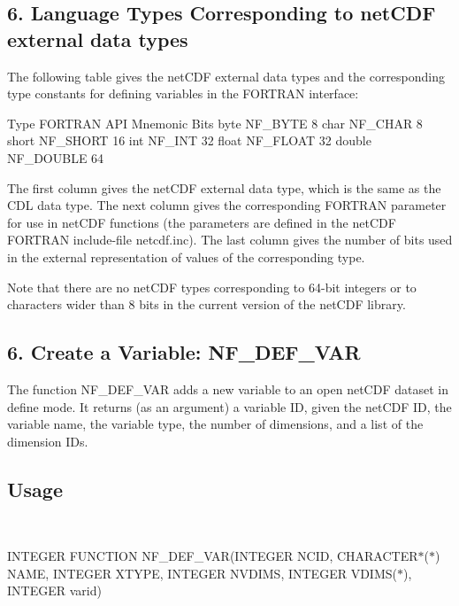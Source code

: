 \subsection*{6. Language Types Corresponding to net\+C\+DF external data types }

The following table gives the net\+C\+DF external data types and the corresponding type constants for defining variables in the F\+O\+R\+T\+R\+AN interface\+:



 Type F\+O\+R\+T\+R\+AN A\+PI Mnemonic Bits byte N\+F\+\_\+\+B\+Y\+TE 8 char N\+F\+\_\+\+C\+H\+AR 8 short N\+F\+\_\+\+S\+H\+O\+RT 16 int N\+F\+\_\+\+I\+NT 32 float N\+F\+\_\+\+F\+L\+O\+AT 32 double N\+F\+\_\+\+D\+O\+U\+B\+LE 64 



The first column gives the net\+C\+DF external data type, which is the same as the C\+DL data type. The next column gives the corresponding F\+O\+R\+T\+R\+AN parameter for use in net\+C\+DF functions (the parameters are defined in the net\+C\+DF F\+O\+R\+T\+R\+AN include-\/file netcdf.\+inc). The last column gives the number of bits used in the external representation of values of the corresponding type.

Note that there are no net\+C\+DF types corresponding to 64-\/bit integers or to characters wider than 8 bits in the current version of the net\+C\+DF library.

\subsection*{6. Create a Variable\+: {\ttfamily N\+F\+\_\+\+D\+E\+F\+\_\+\+V\+AR} }

The function N\+F\+\_\+\+D\+E\+F\+\_\+\+V\+AR adds a new variable to an open net\+C\+DF dataset in define mode. It returns (as an argument) a variable ID, given the net\+C\+DF ID, the variable name, the variable type, the number of dimensions, and a list of the dimension I\+Ds.

\subsection*{Usage }

 

I\+N\+T\+E\+G\+ER F\+U\+N\+C\+T\+I\+ON N\+F\+\_\+\+D\+E\+F\+\_\+\+V\+AR(I\+N\+T\+E\+G\+ER N\+C\+ID, C\+H\+A\+R\+A\+C\+T\+E\+R$\ast$($\ast$) N\+A\+ME, I\+N\+T\+E\+G\+ER X\+T\+Y\+PE, I\+N\+T\+E\+G\+ER N\+V\+D\+I\+MS, I\+N\+T\+E\+G\+ER V\+D\+I\+M\+S($\ast$), I\+N\+T\+E\+G\+ER varid)

